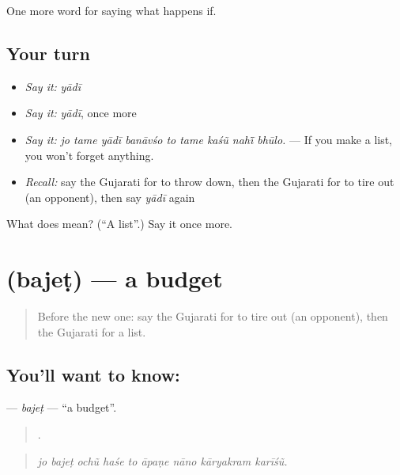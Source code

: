 \begin{grammarlens}[title={What you've built}]
One more word for saying what happens if.
\end{grammarlens}

\subsection*{Your turn}
\begin{itemize}
\raggedright
  \item \emph{Say it:} \emph{yādī}
  \item \emph{Say it:} \emph{yādī}, once more
  \item \emph{Say it:} \emph{jo tame yādī banāvśo to tame kaśũ nahī̃ bhūlo.} — If you make a list, you won't forget anything.
  \item \emph{Recall:} say the Gujarati for to throw down, then the Gujarati for to tire out (an opponent), then say \emph{yādī} again
\end{itemize}

\begin{tcolorbox}[breakable,colback=teal!4,colframe=teal!35!black,title={Before you move on}]
What does  mean? (\textquotedblleft{}A list\textquotedblright{}.) Say it once more.
\end{tcolorbox}
\section[\texorpdfstring{\gu{બજેટ} (bajeṭ)}{બજેટ (bajeṭ)}]{ (bajeṭ) — a budget}

\label{lesson:GU-C528-bajet}



\begin{quote}
Before the new one: say the Gujarati for to tire out (an opponent), then the Gujarati for a list.
\end{quote}

\subsection*{You'll want to know: }
\textbf{} — \emph{bajeṭ} — \textquotedblleft{}a budget\textquotedblright{}.

\begin{quote}
        .
\end{quote}

\begin{quote}
\emph{jo bajeṭ ochũ haśe to āpaṇe nāno kāryakram karīśũ.}
\end{quote}

